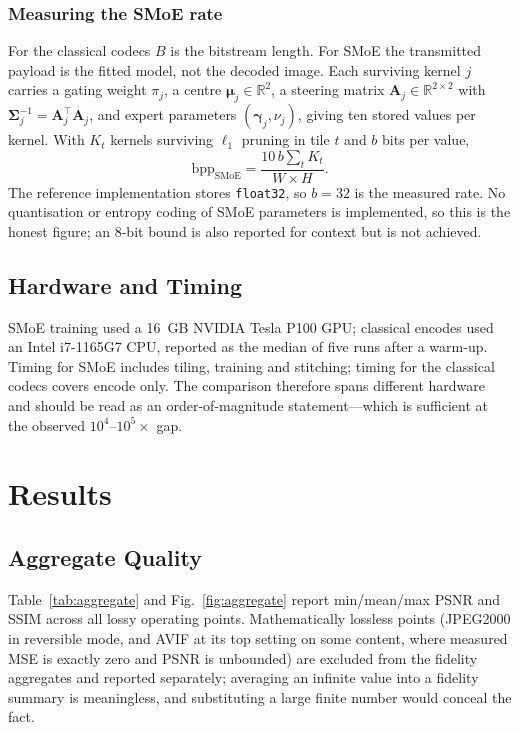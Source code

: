 \documentclass[conference]{IEEEtran}
\begin{document}
\subsubsection{Measuring the SMoE rate}
For the classical codecs $B$ is the bitstream length. For SMoE the transmitted payload is the fitted model, not the decoded image. Each surviving kernel $j$ carries a gating weight $\pi_j$, a centre $\boldsymbol{\mu}_j \in \mathbb{R}^2$, a steering matrix $\mathbf{A}_j \in \mathbb{R}^{2\times2}$ with $\boldsymbol{\Sigma}_j^{-1} = \mathbf{A}_j^{\top}\mathbf{A}_j$, and expert parameters $(\boldsymbol{\gamma}_j, \nu_j)$, giving ten stored values per kernel. With $K_t$ kernels surviving $\ell_1$ pruning in tile $t$ and $b$ bits per value,
\begin{equation}
    \mathrm{bpp}_{\mathrm{SMoE}} = \frac{10\,b \sum_{t} K_t}{W \times H}.
    \label{eq:smoerate}
\end{equation}
The reference implementation stores \texttt{float32}, so $b=32$ is the measured rate. No quantisation or entropy coding of SMoE parameters is implemented, so this is the honest figure; an $8$-bit bound is also reported for context but is not achieved.

\subsection{Hardware and Timing}
SMoE training used a 16~GB NVIDIA Tesla P100 GPU; classical encodes used an Intel i7-1165G7 CPU, reported as the median of five runs after a warm-up. Timing for SMoE includes tiling, training and stitching; timing for the classical codecs covers encode only. The comparison therefore spans different hardware and should be read as an order-of-magnitude statement---which is sufficient at the observed $10^{4}$--$10^{5}\times$ gap.

\section{Results}

\subsection{Aggregate Quality}
Table~\ref{tab:aggregate} and Fig.~\ref{fig:aggregate} report min/mean/max PSNR and SSIM across all lossy operating points. Mathematically lossless points (JPEG2000 in reversible mode, and AVIF at its top setting on some content, where measured MSE is exactly zero and PSNR is unbounded) are excluded from the fidelity aggregates and reported separately; averaging an infinite value into a fidelity summary is meaningless, and substituting a large finite number would conceal the fact.
\end{document}
